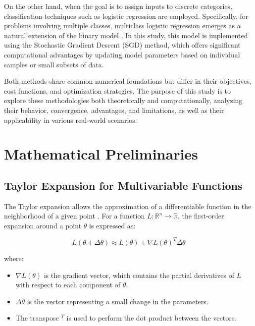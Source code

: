 \documentclass[12pt, letterpaper,conference]{IEEEtran}
\begin{document}
On the other hand, when the goal is to assign inputs to discrete categories, classification techniques such as logistic regression are employed. Specifically, for problems involving multiple classes, multiclass logistic regression emerges as a natural extension of the binary model \cite{aws}. In this study, this model is implemented using the Stochastic Gradient Descent (SGD) method, which offers significant computational advantages by updating model parameters based on individual samples or small subsets of data.

Both methods share common numerical foundations but differ in their objectives, cost functions, and optimization strategies. The purpose of this study is to explore these methodologies both theoretically and computationally, analyzing their behavior, convergence, advantages, and limitations, as well as their applicability in various real-world scenarios.


\vspace{0.5cm}


\section{Mathematical Preliminaries}

\vspace{0.25cm}

\subsection{Taylor Expansion for Multivariable Functions}

The Taylor expansion allows the approximation of a differentiable function in the neighborhood of a given point \cite{openstax}. For a function \( L: \mathbb{R}^n \rightarrow \mathbb{R} \), the first-order expansion around a point \( \theta \) is expressed as:

\[
L(\theta + \Delta \theta) \approx L(\theta) + \nabla L(\theta)^T \Delta \theta
\]

where:
\begin{itemize}
    \item \( \nabla L(\theta) \) is the gradient vector, which contains the partial derivatives of \( L \) with respect to each component of \( \theta \).
    \item \( \Delta \theta \) is the vector representing a small change in the parameters.
    \item The transpose \( ^T \) is used to perform the dot product between the vectors.
\end{itemize}
\end{document}

